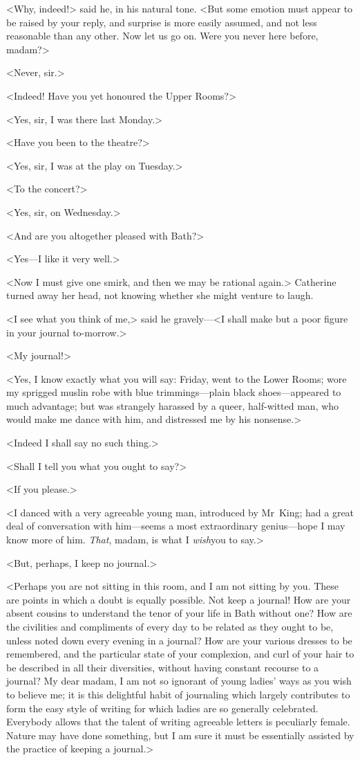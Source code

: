  <Why, indeed!> said he, in his natural tone. <But some emotion must appear to be raised by your reply, and surprise is more easily assumed, and not less reasonable than any other. Now let us go on. Were you never here before, madam?> 

 <Never, sir.> 

 <Indeed! Have you yet honoured the Upper Rooms?> 

 <Yes, sir, I was there last Monday.> 

 <Have you been to the theatre?> 

 <Yes, sir, I was at the play on Tuesday.> 

 <To the concert?> 

 <Yes, sir, on Wednesday.> 

 <And are you altogether pleased with Bath?> 

 <Yes—I like it very well.> 

 <Now I must give one smirk, and then we may be rational again.> Catherine turned away her head, not knowing whether she might venture to laugh. 

 <I see what you think of me,> said he gravely—<I shall make but a poor figure in your journal to-morrow.> 

 <My journal!> 

 <Yes, I know exactly what you will say: Friday, went to the Lower Rooms; wore my sprigged muslin robe with blue trimmings—plain black shoes—appeared to much advantage; but was strangely harassed by a queer, half-witted man, who would make me dance with him, and distressed me by his nonsense.> 

 <Indeed I shall say no such thing.> 

 <Shall I tell you what you ought to say?> 

 <If you please.> 

 <I danced with a very agreeable young man, introduced by Mr~King; had a great deal of conversation with him—seems a most extraordinary genius—hope I may know more of him. \textit{That}, madam, is what I \textit{wish}you to say.> 

 <But, perhaps, I keep no journal.> 

 <Perhaps you are not sitting in this room, and I am not sitting by you. These are points in which a doubt is equally possible. Not keep a journal! How are your absent cousins to understand the tenor of your life in Bath without one? How are the civilities and compliments of every day to be related as they ought to be, unless noted down every evening in a journal? How are your various dresses to be remembered, and the particular state of your complexion, and curl of your hair to be described in all their diversities, without having constant recourse to a journal? My dear madam, I am not so ignorant of young ladies' ways as you wish to believe me; it is this delightful habit of journaling which largely contributes to form the easy style of writing for which ladies are so generally celebrated. Everybody allows that the talent of writing agreeable letters is peculiarly female. Nature may have done something, but I am sure it must be essentially assisted by the practice of keeping a journal.> 


